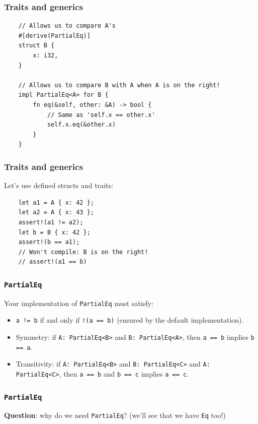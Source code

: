 \documentclass[aspectratio=1610,t]{beamer}
\begin{document}

\begin{frame}[fragile]
\frametitle{Traits and generics}
\begin{verbatim}
    // Allows us to compare A's
    #[derive(PartialEq)]
    struct B {
        x: i32,
    }

    // Allows us to compare B with A when A is on the right!
    impl PartialEq<A> for B {
        fn eq(&self, other: &A) -> bool {
            // Same as 'self.x == other.x'
            self.x.eq(&other.x)
        }
    }
\end{verbatim}
\end{frame}


\begin{frame}[fragile]
\frametitle{Traits and generics}
Let's use defined structs and traits:

\begin{verbatim}
    let a1 = A { x: 42 };
    let a2 = A { x: 43 };
    assert!(a1 != a2);
    let b = B { x: 42 };
    assert!(b == a1);
    // Won't compile: B is on the right!
    // assert!(a1 == b)
\end{verbatim}
\end{frame}


\begin{frame}[fragile]
\frametitle{\texttt{PartialEq}}
Your implementation of \texttt{PartialEq} must satisfy:

\begin{itemize}
    \item \texttt{a != b} if and only if \texttt{!(a == b)} (ensured by the default implementation).
    \item Symmetry: if \texttt{A: PartialEq<B>} and \texttt{B: PartialEq<A>}, then \texttt{a == b} implies \texttt{b == a}.
    \item Transitivity: if \texttt{A: PartialEq<B>} and \texttt{B: PartialEq<C>} and \texttt{A: PartialEq<C>}, then \texttt{a == b} and \texttt{b == c} implies \texttt{a == c}.
\end{itemize}
\end{frame}


\begin{frame}[fragile]
\frametitle{\texttt{PartialEq}}
\textbf{Question}: why do we need \texttt{PartialEq}? (we'll see that we have \texttt{Eq} too!)


\end{frame}
\end{document}
